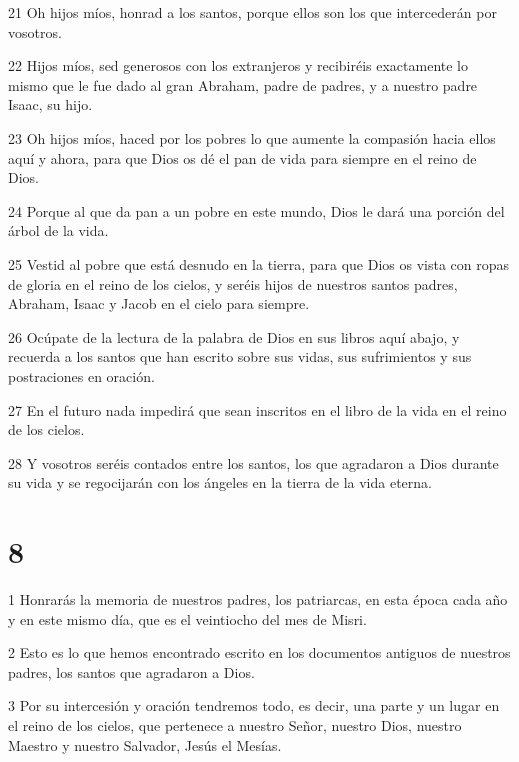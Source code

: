 \par 21 Oh hijos míos, honrad a los santos, porque ellos son los que intercederán por vosotros.

\par 22 Hijos míos, sed generosos con los extranjeros y recibiréis exactamente lo mismo que le fue dado al gran Abraham, padre de padres, y a nuestro padre Isaac, su hijo.

\par 23 Oh hijos míos, haced por los pobres lo que aumente la compasión hacia ellos aquí y ahora, para que Dios os dé el pan de vida para siempre en el reino de Dios.

\par 24 Porque al que da pan a un pobre en este mundo, Dios le dará una porción del árbol de la vida.

\par 25 Vestid al pobre que está desnudo en la tierra, para que Dios os vista con ropas de gloria en el reino de los cielos, y seréis hijos de nuestros santos padres, Abraham, Isaac y Jacob en el cielo para siempre.

\par 26 Ocúpate de la lectura de la palabra de Dios en sus libros aquí abajo, y recuerda a los santos que han escrito sobre sus vidas, sus sufrimientos y sus postraciones en oración.

\par 27 En el futuro nada impedirá que sean inscritos en el libro de la vida en el reino de los cielos.

\par 28 Y vosotros seréis contados entre los santos, los que agradaron a Dios durante su vida y se regocijarán con los ángeles en la tierra de la vida eterna.

\chapter{8}

\par 1 Honrarás la memoria de nuestros padres, los patriarcas, en esta época cada año y en este mismo día, que es el veintiocho del mes de Misri.

\par 2 Esto es lo que hemos encontrado escrito en los documentos antiguos de nuestros padres, los santos que agradaron a Dios.

\par 3 Por su intercesión y oración tendremos todo, es decir, una parte y un lugar en el reino de los cielos, que pertenece a nuestro Señor, nuestro Dios, nuestro Maestro y nuestro Salvador, Jesús el Mesías.

